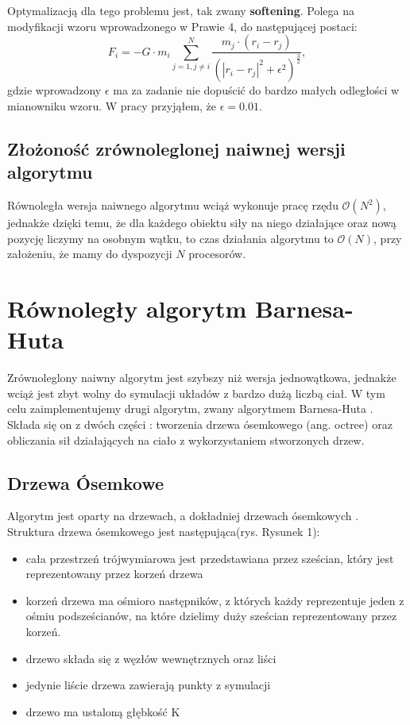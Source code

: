 \documentclass[14pt,twoside,a4paper]{article}
\theoremstyle{definition}
\begin{document}
Optymalizacją dla tego problemu jest, tak zwany \textbf{softening}\cite[str.~21]{Aarseth}. Polega na modyfikacji wzoru wprowadzonego w Prawie 4, do następującej postaci:
$$F_i = -G\cdot m_i \sum_{j=1, j\neq i}^N \frac{m_j\cdot (r_i - r_j)}{(|r_i - r_j|^2 + \epsilon^{2})^{\frac{3}{2}}},$$ 
gdzie wprowadzony $\epsilon$ ma za zadanie nie dopuścić do bardzo małych odległości w mianowniku wzoru. W pracy przyjąłem, że $\epsilon = 0.01$.

\subsection{\Large Złożoność zrównoleglonej naiwnej wersji algorytmu}
Równoległa wersja naiwnego algorytmu wciąż wykonuje pracę rzędu $\mathcal{O}(N^{2})$, jednakże dzięki temu, że dla każdego obiektu siły na niego działające oraz nową pozycję liczymy na osobnym wątku, to czas działania algorytmu to $\mathcal{O}(N)$, przy założeniu, że mamy do dyspozycji $N$ procesorów.

\section{\LARGE Równoległy algorytm Barnesa-Huta}
Zrównoleglony naiwny algorytm jest szybszy niż wersja jednowątkowa, jednakże wciąż jest zbyt wolny do symulacji układów z bardzo dużą liczbą ciał. W tym celu zaimplementujemy drugi algorytm, zwany algorytmem Barnesa-Huta \cite[str.~446-449]{barnhut}. Składa się on z dwóch części : tworzenia drzewa ósemkowego (ang. octree) oraz obliczania sił działających na ciało z wykorzystaniem stworzonych drzew.

\subsection{\Large Drzewa Ósemkowe}
Algorytm jest oparty na drzewach, a dokładniej drzewach ósemkowych \cite{octree}.
Struktura drzewa ósemkowego jest następująca(rys. Rysunek 1):
\begin{itemize}
  \item cała przestrzeń trójwymiarowa jest przedstawiana przez sześcian, który jest reprezentowany przez korzeń drzewa
  \item korzeń drzewa ma ośmioro następników, z których każdy reprezentuje jeden z ośmiu podsześcianów, na które dzielimy duży sześcian reprezentowany przez korzeń.
  \item drzewo składa się z węzłów wewnętrznych oraz liści
  \item jedynie liście drzewa zawierają punkty z symulacji
  \item drzewo ma ustaloną głębkość K
\end{itemize}
\end{document}
